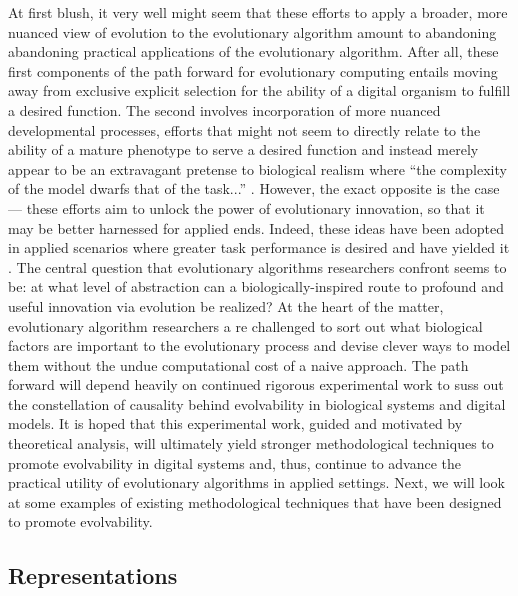 At first blush, it very well might seem that these efforts to apply a broader, more nuanced view of evolution to the evolutionary algorithm amount to abandoning abandoning practical applications of the evolutionary algorithm.
After all, these first components of the path forward for evolutionary computing entails moving away from exclusive explicit selection for the ability of a digital organism to fulfill a desired function.
The second involves incorporation of more nuanced developmental processes, efforts that might not seem to directly relate to the ability of a mature phenotype to serve a desired function and instead merely appear to be an extravagant pretense to biological realism where ``the complexity of the model dwarfs that of the task...'' \cite[p 354]{Downing2015IntelligenceSystems}.
However, the exact opposite is the case --- these efforts aim to unlock the power of evolutionary innovation, so that it may be better harnessed for applied ends.
Indeed, these ideas have been adopted in applied scenarios where greater task performance is desired and have yielded it \cite{Cheney2013UnshacklingEncoding, Mengistu2016EvolvabilityIt, Reisinger2007AcquiringRepresentations, Lehman2008ExploitingNovelty}.
The central question that evolutionary algorithms researchers confront seems to be: at what level of abstraction can a biologically-inspired route to profound and useful innovation via evolution be realized?
At the heart of the matter, evolutionary algorithm researchers a re challenged to sort out what biological factors are important to the evolutionary process and devise clever ways to model them without the undue computational cost of a naive approach.
The path forward will depend heavily on continued rigorous experimental work to suss out the constellation of causality behind evolvability in biological systems and digital models.
It is hoped that this experimental work, guided and motivated by theoretical analysis, will ultimately yield stronger methodological techniques to promote evolvability in digital systems and, thus, continue to advance the practical utility of evolutionary algorithms in applied settings.
Next, we will look at some examples of existing methodological techniques that have been designed to promote evolvability.

\subsection{Representations} \label{sec:representations}

